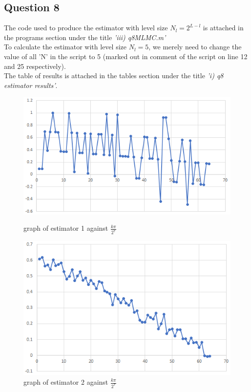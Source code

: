 \documentclass[10pt]{article}
\begin{document}
\subsection*{Question 8}
The code used to produce the estimator with level size $N_l=2^{L-l}$ is attached in the programs section under the title \emph{'iii) q8\textunderscore MLMC.m'}\\
To calculate the estimator with level size $N_l=5$, we merely need to change the value of all 'N' in the script to 5 (marked out in comment of the script on line 12 and 25 respectively).\\
The table of results is attached in the tables section under the title \emph{'i) q8 estimator results'}.
\begin{figure}[H]
    \begin{minipage}[b]{0.5\linewidth}
            \centering
            \includegraphics[width=\textwidth]{q8/q8_graph_1.png}
            \caption{graph of estimator 1 against $\frac{k\pi}{2^7}$}
        \end{minipage}
        \hfill
        \begin{minipage}[b]{0.5\linewidth}
            \centering
            \includegraphics[width=\textwidth]{q8/q8_graph_2.png}
            \caption{graph of estimator 2 against $\frac{k\pi}{2^7}$}
        \end{minipage}
\end{figure}
\end{document}
